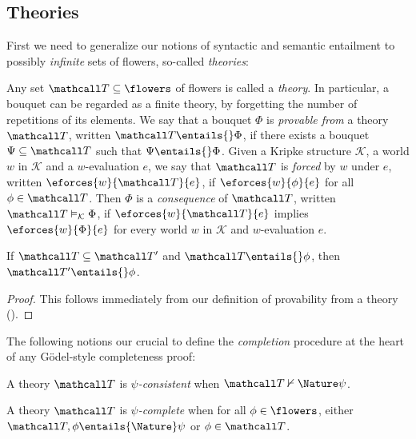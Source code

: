 \subsection{Theories}

First we need to generalize our notions of syntactic and semantic entailment to
possibly \emph{infinite} sets of flowers, so-called \emph{theories}:

\begin{definition}[Theory] 
  
  Any set $\tT \subseteq \flowers$ of flowers is called a \emph{theory}. In
  particular, a bouquet can be regarded as a finite theory, by forgetting the
  number of repetitions of its elements. We say that a bouquet $\Phi$ is
  \emph{provable from} a theory $\tT$, written $\tT \entails{} \Phi$, if there exists a
  bouquet $\Psi \subseteq \tT$ such that $\Psi \entails{} \Phi$. Given a Kripke
  structure $\mathcal{K}$, a world $w$ in $\mathcal{K}$ and a $w$-evaluation
  $e$, we say that $\tT$ is \emph{forced} by $w$ under $e$, written
  $\eforces{w}{\tT}{e}$, if $\eforces{w}{\phi}{e}$ for all $\phi \in \tT$. Then
  $\Phi$ is a \emph{consequence} of $\tT$, written $\tT \vDash_{\mathcal{K}} \Phi$,
  if $\eforces{w}{\tT}{e}$ implies $\eforces{w}{\Phi}{e}$ for every world $w$ in
  $\mathcal{K}$ and $w$-evaluation $e$.
\end{definition}

\begin{lemma}[Weakening]
  If $\tT \subseteq \tT'$ and $\tT \entails{} \phi$, then $\tT' \entails{} \phi$.
\end{lemma}
\begin{proof}
  This follows immediately from our definition of provability from a theory
  ().
\end{proof}

The following notions our crucial to define the \emph{completion} procedure at
the heart of any Gödel-style completeness proof:

\begin{definition}
  A theory $\tT$ is \emph{$\psi$-consistent} when $\tT \nvdash{\Nature} \psi$.
\end{definition}

\begin{definition}
  A theory $\tT$ is \emph{$\psi$-complete} when for all $\phi \in \flowers$,
  either $\tT, \phi \entails{\Nature} \psi$ or $\phi \in \tT$.
\end{definition}

